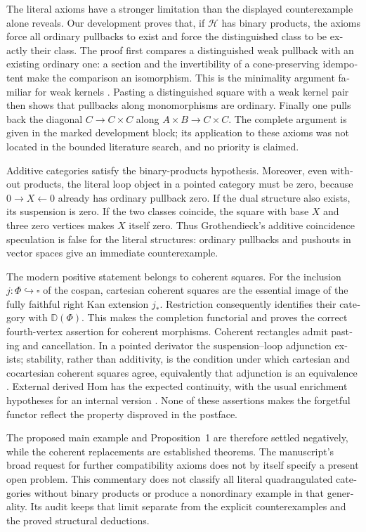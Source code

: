 \begin{otherlanguage}{english}
The literal axioms have a stronger limitation than the displayed counterexample alone reveals. Our development proves that, if $\mathcal H$ has binary products, the axioms force all ordinary pullbacks to exist and force the distinguished class to be exactly their class. The proof first compares a distinguished weak pullback with an existing ordinary one: a section and the invertibility of a cone-preserving idempotent make the comparison an isomorphism. This is the minimality argument familiar for weak kernels \citep[\S1, p.~6 of the 2014 manuscript]{Krause2016FlatCovers}. Pasting a distinguished square with a weak kernel pair then shows that pullbacks along monomorphisms are ordinary. Finally one pulls back the diagonal $C\to C\times C$ along $A\times B\to C\times C$. The complete argument is given in the marked development block; its application to these axioms was not located in the bounded literature search, and no priority is claimed.

Additive categories satisfy the binary-products hypothesis. Moreover, even without products, the literal loop object in a pointed category must be zero, because $0\to X\leftarrow0$ already has ordinary pullback zero. If the dual structure also exists, its suspension is zero. If the two classes coincide, the square with base $X$ and three zero vertices makes $X$ itself zero. Thus Grothendieck's additive coincidence speculation is false for the literal structures: ordinary pullbacks and pushouts in vector spaces give an immediate counterexample.

The modern positive statement belongs to coherent squares. For the inclusion $j:\Phi\hookrightarrow\square$ of the cospan, cartesian coherent squares are the essential image of the fully faithful right Kan extension $j_*$. Restriction consequently identifies their category with $\mathbb D(\Phi)$. This makes the completion functorial and proves the correct fourth-vertex assertion for coherent morphisms. Coherent rectangles admit pasting and cancellation. In a pointed derivator the suspension--loop adjunction exists; stability, rather than additivity, is the condition under which cartesian and cocartesian coherent squares agree, equivalently that adjunction is an equivalence \citetext{\citealp[Proposition~3.17]{Groth2013}; \citealp[Theorem~7.1, arXiv v2]{GrothPontoShulman2014}}. External derived Hom has the expected continuity, with the usual enrichment hypotheses for an internal version \citep[Proposition~6.13]{Cisinski2003}. None of these assertions makes the forgetful functor reflect the property disproved in the postface.

The proposed main example and Proposition~1 are therefore settled negatively, while the coherent replacements are established theorems. The manuscript's broad request for further compatibility axioms does not by itself specify a present open problem. This commentary does not classify all literal quadrangulated categories without binary products or produce a nonordinary example in that generality. Its audit keeps that limit separate from the explicit counterexamples and the proved structural deductions.
\end{otherlanguage}
\dgrchunkend
